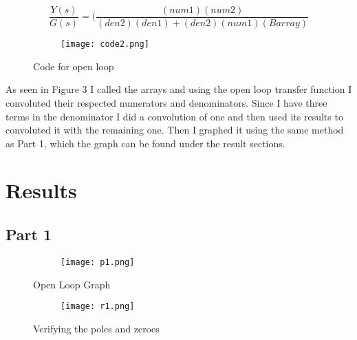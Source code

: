\documentclass[12pt,a4paper]{article}
\begin{document}
\[ \frac{Y(s)}{G(s)} = (\frac{(num1)(num2)}{(den2)(den1)+(den2)(num1)(Barray)} \]   





\begin{figure}[h]
\begin{subfigure}{ 1\textwidth}
\texttt{[image: code2.png]}
\end{subfigure}
\caption{Code for open loop}
\label{fig:image2}
\end{figure}






\clearpage
As seen in Figure 3 I called the arrays and using the open loop transfer function I convoluted their respected numerators and denominators. Since I have three terms in the denominator I did a convolution of one and then used its results to convoluted it with the remaining one. Then I graphed it using the same method as Part 1, which the graph can be found under the result sections.
















\section{Results}\label{sec:res}

\subsection{Part 1}

\begin{figure}[h]
\centering
\begin{subfigure}{ 1\textwidth}
\texttt{[image: p1.png]}
\end{subfigure}
\caption{ Open Loop Graph}
\label{fig2:image22}
\end{figure}




\begin{figure}[h]
\centering
\begin{subfigure}{ 1\textwidth}
\texttt{[image: r1.png]}
\end{subfigure}
\caption{ Verifying the poles and zeroes }
\label{fig2:image22}
\end{figure}
\clearpage
\end{document}
